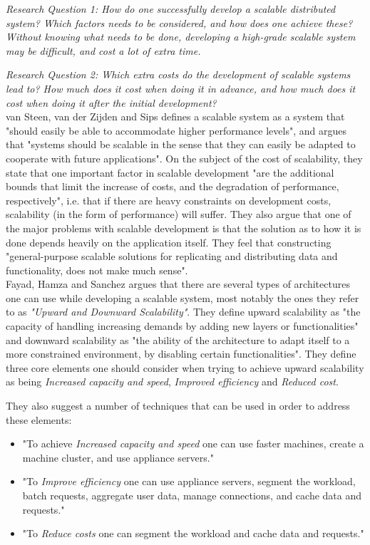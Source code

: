 \documentclass{article}
\begin{document}
{\scriptsize \emph{Research Question 1: How do one successfully develop a
scalable distributed system? Which factors needs to be considered, and how does
one achieve these? Without knowing what needs to be done, developing a
high-grade scalable system may be difficult, and cost a lot of extra time.}}

{\scriptsize \emph{Research Question 2: Which extra costs do the development of
scalable systems lead to? How much does it cost when doing it in advance, and
how much does it cost when doing it after the initial development?}}
\\

van Steen, van der Zijden and Sips\cite{van1998software} defines a scalable
system as a system that "should easily be able to accommodate higher
performance levels", and argues that "systems should be scalable in the sense
that they can easily be adapted to cooperate with future applications".  On the
subject of the cost of scalability, they state that one important factor in
scalable development "are the additional bounds that limit the increase of
costs, and the degradation of performance, respectively", i.e. that if there
are heavy constraints on development costs, scalability (in the form of
performance) will suffer.  They also argue that one of the major problems with
scalable development is that the solution as to how it is done depends heavily
on the application itself.  They feel that constructing "general-purpose
scalable solutions for replicating and distributing data and functionality,
does not make much sense".
\\

Fayad, Hamza and Sanchez \cite{fayad2005towards} argues that there are several
types of architectures one can use while developing a scalable system, most
notably the ones they refer to as \emph{"Upward and Downward Scalability"}.
They define upward scalability as "the capacity of handling increasing demands
by adding new layers or functionalities" and downward scalability as "the
ability of the architecture to adapt itself to a more constrained environment,
by disabling certain functionalities".
They define three core elements one should consider when trying to achieve
upward scalability as being \emph{Increased capacity and speed}, \emph{Improved
efficiency} and \emph{Reduced cost}. 

They also suggest a number of techniques that can be used in order to address
these elements: 
\begin{itemize}
\item{"To achieve \emph{Increased capacity and speed} one can use faster
machines, create a machine cluster, and use appliance servers."} 
\item{"To \emph{Improve efficiency} one can use appliance servers, segment the
workload, batch requests, aggregate user data, manage connections, and cache
data and requests."}  
\item{"To \emph{Reduce costs} one can segment the workload and cache data and
requests."}
\end{itemize}
\end{document}
